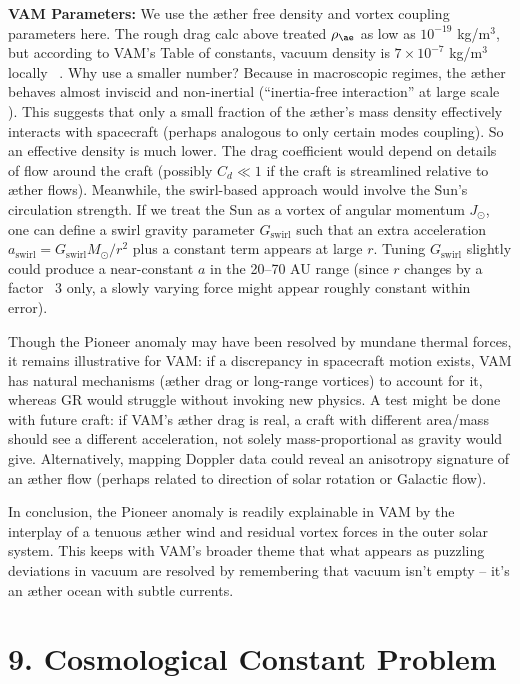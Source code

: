 \documentclass[a4paper, aps,preprint,superscriptaddress, 12pt]{revtex4}
\begin{document}
\textbf{VAM Parameters:} We use the æther free density and vortex coupling parameters here. The rough drag calc above treated $\rho_{\ae}$ as low as $10^{-19}$ kg/m$^3$, but according to VAM’s Table of constants, vacuum density is $7\times10^{-7}$ kg/m$^3$ locally~\cite{VAM_constants} . Why use a smaller number? Because in macroscopic regimes, the æther behaves almost inviscid and non-inertial (“inertia-free interaction” at large scale~\cite{Iskandarani2025b} ). This suggests that only a small fraction of the æther’s mass density effectively interacts with spacecraft (perhaps analogous to only certain modes coupling). So an effective density is much lower. The drag coefficient would depend on details of flow around the craft (possibly $C_d\ll1$ if the craft is streamlined relative to æther flows). Meanwhile, the swirl-based approach would involve the Sun’s circulation strength. If we treat the Sun as a vortex of angular momentum $J_\odot$, one can define a swirl gravity parameter $G_{\text{swirl}}$ such that an extra acceleration $a_{\text{swirl}} = G_{\text{swirl}} M_\odot/r^2$ plus a constant term appears at large $r$. Tuning $G_{\text{swirl}}$ slightly could produce a near-constant $a$ in the 20–70 AU range (since $r$ changes by a factor ~3 only, a slowly varying force might appear roughly constant within error).


Though the Pioneer anomaly may have been resolved by mundane thermal forces, it remains illustrative for VAM: if a discrepancy in spacecraft motion exists, VAM has natural mechanisms (æther drag or long-range vortices) to account for it, whereas GR would struggle without invoking new physics. A test might be done with future craft: if VAM’s æther drag is real, a craft with different area/mass should see a different acceleration, not solely mass-proportional as gravity would give. Alternatively, mapping Doppler data could reveal an anisotropy signature of an æther flow (perhaps related to direction of solar rotation or Galactic flow).


In conclusion, the Pioneer anomaly is readily explainable in VAM by the interplay of a tenuous æther wind and residual vortex forces in the outer solar system. This keeps with VAM’s broader theme that what appears as puzzling deviations in vacuum are resolved by remembering that vacuum isn’t empty – it’s an æther ocean with subtle currents.


\section*{9. Cosmological Constant Problem}
\end{document}

